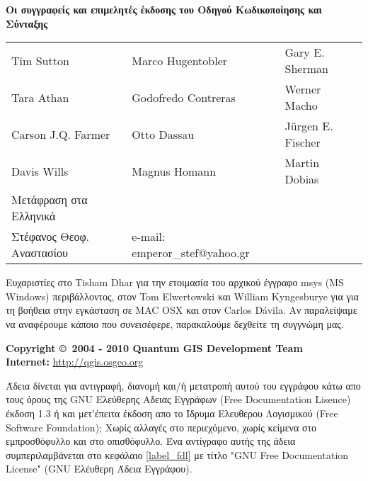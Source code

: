 \begin{flushleft}
\textbf{Οι συγγραφείς και επιμελητές έκδοσης του Οδηγού Κωδικοποίησης και Σύνταξης}
 
\begin{tabular}{p{5cm} p{5cm} p{5cm}}
Tim Sutton & Marco Hugentobler & Gary E. Sherman \\
Tara Athan & Godofredo Contreras & Werner Macho \\
Carson J.Q. Farmer & Otto Dassau & J\"urgen E. Fischer \\
Davis Wills & Magnus Homann & Martin Dobias \\ 

Μετάφραση στα Ελληνικά \\
Στέφανος Θεοφ. Αναστασίου & e-mail: emperor\_stef@yahoo.gr\\
\end{tabular}

Ευχαριστίες στο Tisham Dhar για την ετοιμασία του αρχικού έγγραφο msys (MS Windows) περιβάλλοντος, στον Tom Elwertowski και William Kyngesburye για για τη βοήθεια στην εγκάσταση σε MAC OSX και στον Carlos D\'{a}vila. Αν παραλείψαμε να αναφέρουμε κάποιο που συνεισέφερε, παρακαλούμε δεχθείτε τη συγγνώμη μας. 
\vspace{0.5cm}

\textbf{Copyright \copyright~2004 - 2010 Quantum GIS Development Team} \\
\textbf{Internet:} \url{http://qgis.osgeo.org}
\end{flushleft}

\newpage


Άδεια δίνεται για αντιγραφή, διανομή και/ή μετατροπή αυτού του εγγράφου κάτω απο τους όρους της GNU Ελεύθερης Αδειας Εγγράφων (Free Documentation Lisence) έκδοση 1.3 ή και μετ’έπειτα έκδοση απο το Ίδρυμα Ελευθερου Λογισμικού (Free Software Foundation); Χωρίς αλλαγές στο περιεχόμενο, χωρίς κείμενα στο εμπροσθόφυλλο και στο οπισθόφυλλο. Ένα αντίγραφο αυτής της άδεια συμπεριλαμβάνεται στο κεφάλαιο \ref{label_fdl} με τίτλο "GNU Free Documentation License" (GNU Ελέυθερη Άδεια Εγγράφου).

